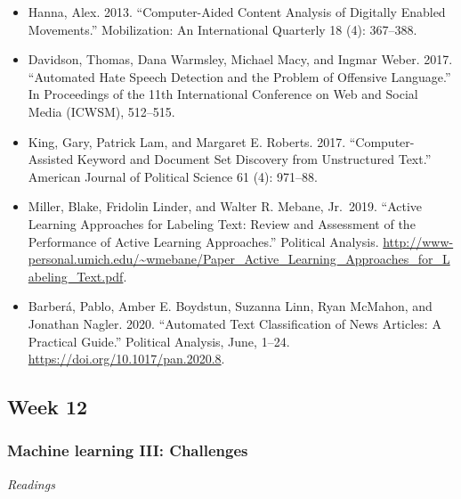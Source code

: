 \documentclass[
  10pt,
]{article}
\providecommand{\tightlist}{%
  \setlength{\itemsep}{0pt}\setlength{\parskip}{0pt}}
\begin{document}
\begin{itemize}
\tightlist
\item
  Hanna, Alex. 2013. ``Computer-Aided Content Analysis of Digitally
  Enabled Movements.'' Mobilization: An International Quarterly 18 (4):
  367--388.
\item
  Davidson, Thomas, Dana Warmsley, Michael Macy, and Ingmar Weber. 2017.
  ``Automated Hate Speech Detection and the Problem of Offensive
  Language.'' In Proceedings of the 11th International Conference on Web
  and Social Media (ICWSM), 512--515.
\item
  King, Gary, Patrick Lam, and Margaret E. Roberts. 2017.
  ``Computer-Assisted Keyword and Document Set Discovery from
  Unstructured Text.'' American Journal of Political Science 61 (4):
  971--88.
\item
  Miller, Blake, Fridolin Linder, and Walter R. Mebane, Jr.~2019.
  ``Active Learning Approaches for Labeling Text: Review and Assessment
  of the Performance of Active Learning Approaches.'' Political
  Analysis.
  \url{http://www-personal.umich.edu/~wmebane/Paper_Active_Learning_Approaches_for_Labeling_Text.pdf}.
\item
  Barberá, Pablo, Amber E. Boydstun, Suzanna Linn, Ryan McMahon, and
  Jonathan Nagler. 2020. ``Automated Text Classification of News
  Articles: A Practical Guide.'' Political Analysis, June, 1--24.
  \url{https://doi.org/10.1017/pan.2020.8}.
\end{itemize}

\hypertarget{week-12}{%
\subsection{Week 12}\label{week-12}}

\hypertarget{machine-learning-iii-challenges}{%
\subsubsection{Machine learning III:
Challenges}\label{machine-learning-iii-challenges}}

\emph{Readings}
\end{document}
